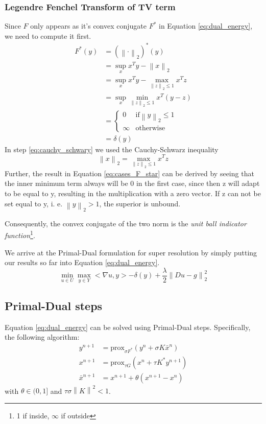 \documentclass{paper}
\newcommand{\prox}{\text{prox}}
\newcommand{\norm}[1]{\left\lVert#1\right\rVert}
\newcommand{\twonorm}[1]{\left\lVert#1\right\rVert_2}
\begin{document}
\subsubsection*{Legendre Fenchel Transform of TV term}
Since $F$ only appears as it's convex conjugate $F^*$ in Equation \eqref{eq:dual_energy}, we need to compute it first.
\begin{align}
	F^*(y) &= (\norm{\cdot}_2)^*(y) \\
		  &= \sup_x x^T y - \twonorm{x} \\
		  &= \sup_x x^T y - \max_{\twonorm{z} \leq 1} x^T z \label{eq:cauchy_schwary}\\
		  &= \sup_x \min_{\twonorm{z} \leq 1} x^T(y-z) \\
		  &= \begin{cases}
   				0  			& \text{if} \twonorm{y} \leq 1 \\
   				\infty      & \text{otherwise}
  			 \end{cases} \label{eq:cases_F_star} \\
  	      &= \delta(y)
\end{align}
In step \eqref{eq:cauchy_schwary} we used the Cauchy-Schwarz inequality
\begin{equation}
	\twonorm{x} = \max_{\twonorm{z} \leq 1} x^T z
\end{equation}
Further, the result in Equation \eqref{eq:cases_F_star} can be derived by seeing that 
the inner minimum term always will be 0 in the first case, since then z will adapt to be
equal to y, resulting in the multiplication with a zero vector. If z can not be set equal
to y, i. e. $\twonorm{y} > 1$, the superior is unbound.

Consequently, the convex conjugate of the two norm is the \emph{unit ball indicator function}\footnote{1 if inside, $\infty$ if outside}.

We arrive at the Primal-Dual formulation for super resolution by simply putting our
results so far into Equation \eqref{eq:dual_energy}.
\begin{equation}
\min_{u \in U} \max_{y \in Y} <\nabla u, y> - \delta(y) + \frac{\lambda}{2}\twonorm{Du - g}^2
\end{equation}

\subsection*{Primal-Dual steps}
Equation \eqref{eq:dual_energy} can be solved using Primal-Dual steps. Specifically,
the following algorithm:
\begin{align}
	y^{n+1} &= \prox_{\sigma F^*}(y^n + \sigma K \bar{x}^n) \label{eq:yn1} \\
	x^{n+1} &= \prox_{\tau G}(x^n + \tau K^* y^{n+1}) \\
	\bar{x}^{n+1} &= x^{n+1} + \theta(x^{n+1} - x^n)
\end{align}
with $\theta \in (0, 1]$ and $\tau \sigma \norm{K}^2 < 1$. 
\end{document}
